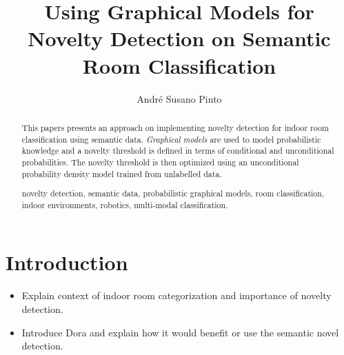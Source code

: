 \documentclass[runningheads,a4paper]{llncs}
\newcommand{\keywords}[1]{\par\addvspace\baselineskip
\noindent\keywordname\enspace\ignorespaces#1}
\begin{document}
\mainmatter  %

\title{Using Graphical Models for Novelty Detection on Semantic Room Classification}


%
%
\author{André Susano Pinto}
%


\maketitle


\begin{abstract}
This papers presents an approach on implementing novelty detection for indoor room classification
using semantic data.
\emph{Graphical models} are used to model probabilistic knowledge and a novelty threshold is
defined in terms of conditional and unconditional probabilities.
The novelty threshold is then optimized using an unconditional probability density
model trained from unlabelled data.


\keywords{novelty detection, semantic data, probabilistic graphical models,
room classification, indoor environments, robotics, multi-modal classification.}
\end{abstract}


\section{Introduction}
\begin{itemize}
\item Explain context of indoor room categorization and importance of novelty detection.
\item Introduce Dora and explain how it would benefit or use the semantic novel detection.
\end{itemize}
\end{document}
